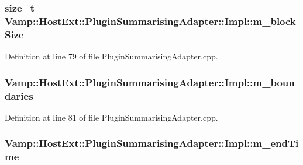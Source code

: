 \subsubsection[{\texorpdfstring{m\+\_\+block\+Size}{m_blockSize}}]{\setlength{\rightskip}{0pt plus 5cm}size\+\_\+t Vamp\+::\+Host\+Ext\+::\+Plugin\+Summarising\+Adapter\+::\+Impl\+::m\+\_\+block\+Size\hspace{0.3cm}{\ttfamily [protected]}}\hypertarget{class_vamp_1_1_host_ext_1_1_plugin_summarising_adapter_1_1_impl_a9de14d13b51d7bf33ca5a8a6301cfe33}{}\label{class_vamp_1_1_host_ext_1_1_plugin_summarising_adapter_1_1_impl_a9de14d13b51d7bf33ca5a8a6301cfe33}


Definition at line 79 of file Plugin\+Summarising\+Adapter.\+cpp.

\subsubsection[{\texorpdfstring{m\+\_\+boundaries}{m_boundaries}}]{ Vamp\+::\+Host\+Ext\+::\+Plugin\+Summarising\+Adapter\+::\+Impl\+::m\+\_\+boundaries\hspace{0.3cm}{\ttfamily [protected]}}\hypertarget{class_vamp_1_1_host_ext_1_1_plugin_summarising_adapter_1_1_impl_aee7d159ac6fc33befc5f67100aa0ecd0}{}\label{class_vamp_1_1_host_ext_1_1_plugin_summarising_adapter_1_1_impl_aee7d159ac6fc33befc5f67100aa0ecd0}


Definition at line 81 of file Plugin\+Summarising\+Adapter.\+cpp.

\subsubsection[{\texorpdfstring{m\+\_\+end\+Time}{m_endTime}}]{ Vamp\+::\+Host\+Ext\+::\+Plugin\+Summarising\+Adapter\+::\+Impl\+::m\+\_\+end\+Time\hspace{0.3cm}{\ttfamily [protected]}}\hypertarget{class_vamp_1_1_host_ext_1_1_plugin_summarising_adapter_1_1_impl_aaf9779f5a71751edf56489b1a9c0e634}{}\label{class_vamp_1_1_host_ext_1_1_plugin_summarising_adapter_1_1_impl_aaf9779f5a71751edf56489b1a9c0e634}


